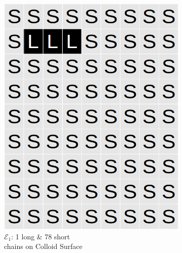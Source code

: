 \documentclass[journal=mamobx,manuscript=article]{achemso}
\begin{document}
\begin{figure}[H]
\begin{subfigure}[b]{0.4\textwidth}
        \includegraphics[scale=0.15]{Sup_Fig1b.png}
        \caption{$\mathcal{E}_1$: 1 long \& 78 short \\chains on Colloid Surface}
        \label{fig:B}
    \end{subfigure}
    \begin{subfigure}[b]{0.4\textwidth}

\end{subfigure}
\end{figure}
\end{document}
